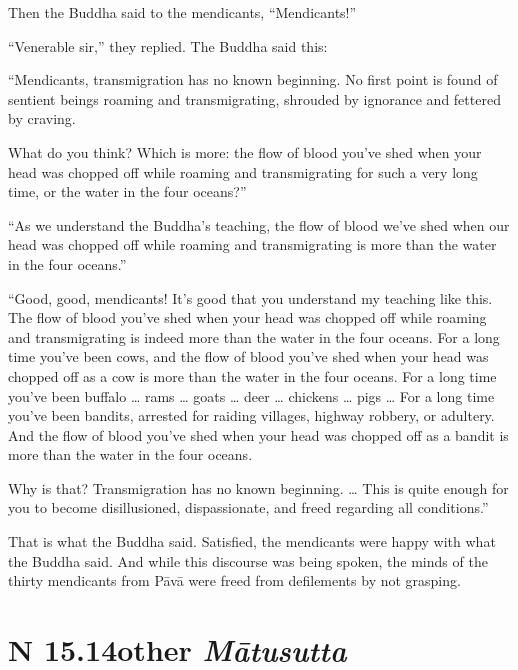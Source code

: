 \documentclass[12pt,openany]{book}%
\newcommand*{\suttatitleacronym}[1]{\smaller[2]{#1}\vspace*{.3em}}
\newcommand*{\suttatitletranslation}[1]{\linebreak{#1}}
\newcommand*{\suttatitleroot}[1]{\linebreak\smaller[2]\itshape{#1}}
\newcommand*{\tocacronym}[1]{\hspace*{-3.3em}{#1}\quad}
\newcommand*{\toctranslation}[1]{#1}
\newcommand*{\tocroot}[1]{(\textit{#1})}
\begin{document}
Then the Buddha said to the mendicants, “Mendicants!” 

“Venerable sir,” they replied. The Buddha said this: 

“Mendicants, transmigration has no known beginning. No first point is found of sentient beings roaming and transmigrating, shrouded by ignorance and fettered by craving. 

What do you think? Which is more: the flow of blood you’ve shed when your head was chopped off while roaming and transmigrating for such a very long time, or the water in the four oceans?” 

“As we understand the Buddha’s teaching, the flow of blood we’ve shed when our head was chopped off while roaming and transmigrating is more than the water in the four oceans.” 

“Good, good, mendicants! It’s good that you understand my teaching like this. The flow of blood you’ve shed when your head was chopped off while roaming and transmigrating is indeed more than the water in the four oceans. For a long time you’ve been cows, and the flow of blood you’ve shed when your head was chopped off as a cow is more than the water in the four oceans. For a long time you’ve been buffalo … rams … goats … deer … chickens … pigs … For a long time you’ve been bandits, arrested for raiding villages, highway robbery, or adultery. And the flow of blood you’ve shed when your head was chopped off as a bandit is more than the water in the four oceans. 

Why is that? Transmigration has no known beginning. … This is quite enough for you to become disillusioned, dispassionate, and freed regarding all conditions.” 

That is what the Buddha said. Satisfied, the mendicants were happy with what the Buddha said. And while this discourse was being spoken, the minds of the thirty mendicants from \textsanskrit{Pāvā} were freed from defilements by not grasping. 

%
\section*{{\suttatitleacronym SN 15.14}{\suttatitletranslation Mother }{\suttatitleroot Mātusutta}}
\addcontentsline{toc}{section}{\tocacronym{SN 15.14} \toctranslation{Mother } \tocroot{Mātusutta}}
\end{document}
